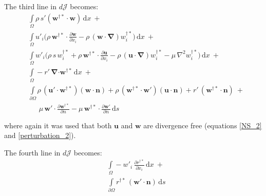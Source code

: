 \documentclass[12pt, a4paper]{article}
\begin{document}
    The third line in $d \mathcal{J}$ becomes:
    \begin{equation}
    \begin{split}
        &\int\limits_{\Omega}
            \rho \, s' (\mathbf{w^{\dagger *} \cdot w})
        \, \mathrm{d} x \ + \\
        &\int\limits_{\Omega} u'_i \bigg( 
            \rho \, \mathbf{w^{\dagger *} \cdot} \frac{\partial \mathbf{w}}{\partial x_i} - 
            \rho \, (\mathbf{w \cdot} \boldsymbol{\nabla}) w^{\dagger *}_i
        \bigg) \, \mathrm{d} x \ + \\
        &\int\limits_{\Omega} w'_i \bigg( 
            \rho \, s \, w^{\dagger *}_i + 
            \rho \, \mathbf{w^{\dagger *} \cdot} \frac{\partial \mathbf{u}}{\partial x_i} - 
            \rho \, (\mathbf{u \cdot} \boldsymbol{\nabla}) w^{\dagger *}_i - 
            \mu \, \nabla^2 w^{\dagger *}_i
        \bigg) \, \mathrm{d} x \ + \\
        &\int\limits_{\Omega}
            - r' \, \boldsymbol{\nabla} \mathbf{\cdot w^{\dagger *}}
        \, \mathrm{d} x \ + \\
        &\int\limits_{\partial \Omega}
            \rho \, (\mathbf{u' \cdot w^{\dagger *}}) (\mathbf{w \cdot n}) + 
            \rho \, (\mathbf{w^{\dagger *} \cdot w'}) (\mathbf{u \cdot n}) + 
            r' \, (\mathbf{w^{\dagger *} \cdot n}) \ + \\
        & \phantom{\int\limits_{\partial \Omega} \ }
            \mu \, \mathbf{w' \cdot} \frac{\partial \mathbf{w^{\dagger *}}}{\partial n} - 
            \mu \, \mathbf{w^{\dagger *} \cdot} \frac{\partial \mathbf{w'}}{\partial n}
        \, \mathrm{d} s
    \end{split}
    \end{equation}
    where again it was used that both $\mathbf{u}$ and $\mathbf{w}$ are divergence free (equations \ref{NS_2} and \ref{perturbation_2}).
    
    The fourth line in $d \mathcal{J}$ becomes:
    \begin{equation}
    \begin{split}
        &\int\limits_{\Omega}
            - w'_i \, \frac{\partial r^{\dagger *}}{\partial x_i}
        \, \mathrm{d} x \ + \\
        &\int\limits_{\partial \Omega}
            r^{\dagger *} \, (\mathbf{w' \cdot n})
        \, \mathrm{d} s
    \end{split}
    \end{equation}
    
\end{document}
